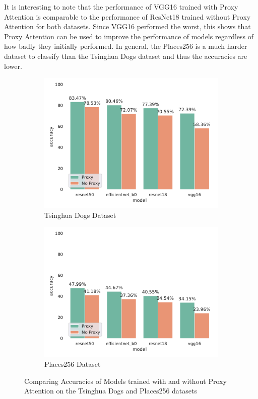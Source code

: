 It is interesting to note that the performance of VGG16 trained with Proxy Attention is comparable to the performance of ResNet18 trained without Proxy Attention for both datasets. Since VGG16 performed the worst, this shows that Proxy Attention can be used to improve the performance of models regardless of how badly they initially performed.
In general, the Places256 is a much harder dataset to classify than the Tsinghua Dogs dataset and thus the accuracies are lower.

\begin{figure}[!htb]
    \begin{subfigure}[h]{.5\textwidth}
        \includegraphics[width=\linewidth, right]{results/tsing_results.pdf}
        \caption{Tsinghua Dogs Dataset}
    \end{subfigure}
    \begin{subfigure}[h]{.5\textwidth}
        \includegraphics[width=\linewidth, left]{results/places256_results.pdf}
        \caption{Places256 Dataset}
    \end{subfigure}
    \caption{Comparing Accuracies of Models trained with and without Proxy Attention on the Tsinghua Dogs and Places256 datasets}
    \label{fig:tsing_places256_results}
\end{figure}

